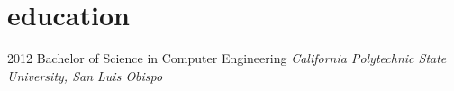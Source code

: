 \documentclass[print]{friggeri-cv}
\begin{document}
\section{education}

\begin{entrylist}
  \entry
    {2012}
    {Bachelor of Science {\normalfont in Computer Engineering}}
    {}
    {\emph{California Polytechnic State University, San Luis Obispo}}
\end{entrylist}





\end{document}
